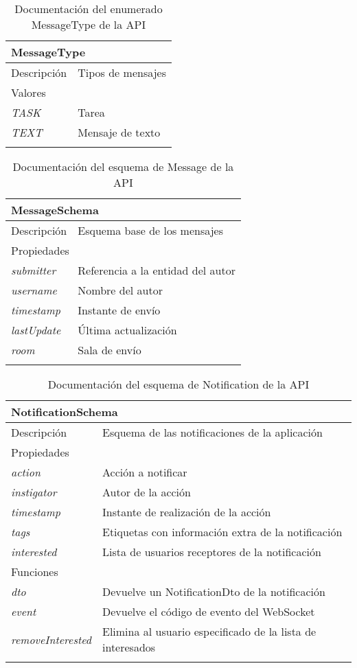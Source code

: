\begin{longtable}{|p{} p{}|}
    \hline
    \multicolumn{2}{|l|}{\textbf{MessageType}} \\ \hline \hline
    Descripción      & Tipos de mensajes \\ \hline
    \multicolumn{2}{|l|}{Valores} \\
    \emph{TASK}  & Tarea  \\
    \emph{TEXT}  & Mensaje de texto  \\ \hline
    \caption{Documentación del enumerado MessageType de la API}
    \label{dis:api:message_type}
\end{longtable}

\begin{longtable}{|p{} p{}|}
    \hline
    \multicolumn{2}{|l|}{\textbf{MessageSchema}} \\ \hline \hline
    Descripción      & Esquema base de los mensajes \\ \hline
    \multicolumn{2}{|l|}{Propiedades} \\
    \emph{submitter}  & Referencia a la entidad del autor  \\
    \emph{username}  & Nombre del autor \\
    \emph{timestamp}  & Instante de envío \\
    \emph{lastUpdate}  & Última actualización  \\
    \emph{room}  & Sala de envío  \\ \hline
    \caption{Documentación del esquema de Message de la API}
    \label{dis:api:message}
\end{longtable}

\begin{longtable}{|p{} p{}|}
    \hline
    \multicolumn{2}{|l|}{\textbf{NotificationSchema}} \\ \hline \hline
    Descripción      & Esquema de las notificaciones de la aplicación \\ \hline
    \multicolumn{2}{|l|}{Propiedades} \\
    \emph{action}  & Acción a notificar  \\
    \emph{instigator}  & Autor de la acción  \\
    \emph{timestamp}  & Instante de realización de la acción  \\
    \emph{tags}  & Etiquetas con información extra de la notificación  \\
    \emph{interested}  & Lista de usuarios receptores de la notificación  \\ \hline
    \multicolumn{2}{|l|}{Funciones} \\
    \emph{dto}  & Devuelve un NotificationDto de la notificación  \\
    \emph{event}  & Devuelve el código de evento del WebSocket \\
    \emph{removeInterested}  & Elimina al usuario especificado de la lista de interesados  \\ \hline
    \caption{Documentación del esquema de Notification de la API}
    \label{dis:api:notification}
\end{longtable}

